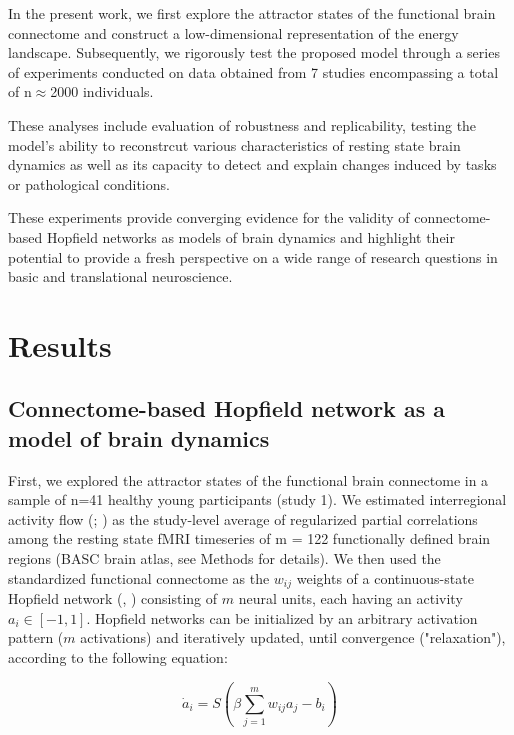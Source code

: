 \documentclass{article}
\begin{document}
In the present work, we first explore the attractor states of the functional brain connectome and construct a low-dimensional representation of the energy landscape.
Subsequently, we rigorously test the proposed model through a series of experiments conducted on data obtained from 7 studies encompassing a total of n$\approx$2000 individuals.

These analyses include evaluation of robustness and replicability, testing the model's ability to reconstrcut various characteristics of resting state brain dynamics as well as its capacity to detect and explain changes induced by tasks or pathological conditions.

These experiments provide converging evidence for the validity of connectome-based Hopfield networks as models of brain dynamics and highlight their potential to provide a fresh perspective on a wide range  of research questions in basic and translational neuroscience.

\section{Results}\label{Results}

\subsection{Connectome-based Hopfield network as a model of brain dynamics}\label{Connectome-based Hopfield network as a model of brain dynamics}

First, we explored the attractor states of the functional brain connectome in a sample of n=41 healthy young participants (study 1). We estimated interregional activity flow (\href{https://doi.org/10.1038/nn.4406}{}; \href{https://doi.org/10.1038/s41467-017-01000-w}{}) as the study-level average of regularized partial correlations among the resting state fMRI timeseries of m = 122 functionally defined brain regions (BASC brain atlas, see Methods for details). We then used the standardized functional connectome as the $w_{ij}$  weights of a continuous-state Hopfield network (\href{https://doi.org/10.1073/pnas.79.8.2554}{}, \href{https://doi.org/10.1162/neco.1994.6.3.459}{}) consisting of $m$ neural units, each having an activity $a_i \in [ -1,1]$. Hopfield networks can be initialized by an arbitrary activation pattern ($m$ activations) and iteratively updated, until convergence ("relaxation"), according to the following equation:

\begin{equation}
\label{hopfield-update}
\dot{a}_i = S(\beta \sum_{j=1}^m w_{ij}a_j - b_i)
\end{equation}
\end{document}
